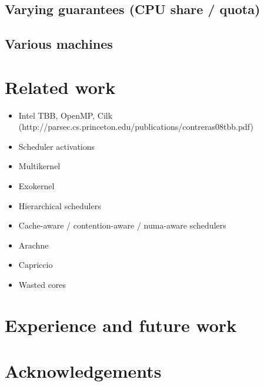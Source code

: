 \documentclass[10pt,preprint]{sigplanconf}
\begin{document}
\subsection{Varying guarantees (CPU share / quota)}

\subsection{Various machines}

\section{Related work}
\begin{itemize}
  \item Intel TBB, OpenMP, Cilk (http://parsec.cs.princeton.edu/publications/contreras08tbb.pdf)
  \item Scheduler activations
  \item Multikernel
  \item Exokernel
  \item Hierarchical schedulers
  \item Cache-aware / contention-aware / numa-aware schedulers
  \item Arachne
  \item Capriccio
  \item Wasted cores
\end{itemize}

\section{Experience and future work}

\section*{Acknowledgements}

{}

\end{document}
